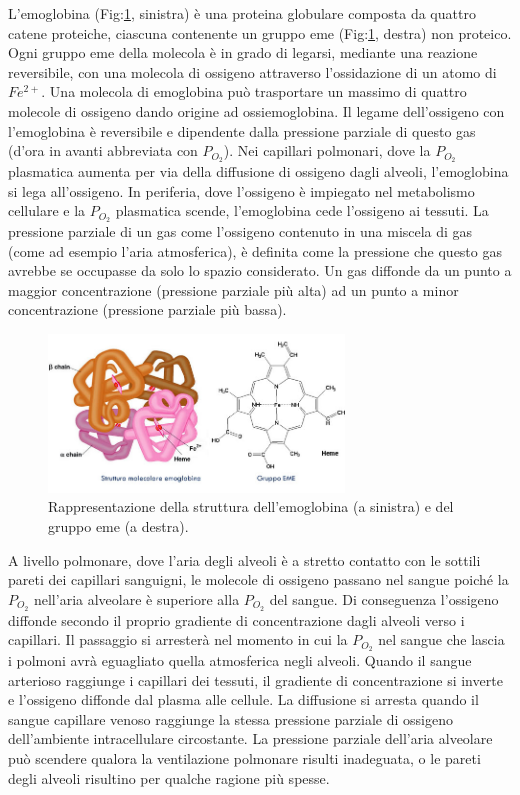 \documentclass[a4paper, 12pt]{book}
\begin{document}
L'emoglobina (Fig:\ref{fig:Structure}, sinistra) è una proteina globulare composta da quattro catene proteiche, ciascuna contenente un gruppo eme (Fig:\ref{fig:Structure}, destra) non proteico.
Ogni gruppo eme della molecola è in grado di legarsi, mediante una reazione reversibile, con una molecola di ossigeno attraverso l’ossidazione di un atomo di $Fe^{2+}$.
Una molecola di emoglobina può trasportare un massimo di quattro molecole di ossigeno dando origine ad ossiemoglobina.
Il legame dell'ossigeno con l'emoglobina è reversibile e dipendente dalla pressione parziale di questo gas (d'ora in avanti abbreviata con $P_{O_2}$).
Nei capillari polmonari, dove la $P_{O_2}$ plasmatica aumenta per via della diffusione di ossigeno dagli alveoli, l'emoglobina si lega all'ossigeno.
In periferia, dove l'ossigeno è impiegato nel metabolismo cellulare e la $P_{O_2}$ plasmatica scende, l'emoglobina cede l'ossigeno ai tessuti.
La pressione parziale di un gas come l'ossigeno contenuto in una miscela di gas (come ad esempio l'aria atmosferica), è definita come la pressione che questo gas avrebbe se occupasse da solo lo spazio considerato.
Un gas diffonde da un punto a maggior concentrazione (pressione parziale più alta) ad un punto a minor concentrazione (pressione parziale più bassa).
\begin{figure}[h!]
    \centering
    \includegraphics[width=0.7\textwidth]{emoglobina-struttura.jpeg}
    \caption{Rappresentazione della struttura dell'emoglobina (a sinistra) e del gruppo 			 eme (a destra).}
    \label{fig:Structure}
\end{figure}
A livello polmonare, dove l'aria degli alveoli è a stretto contatto con le sottili pareti dei capillari sanguigni, le molecole di ossigeno passano nel sangue poiché la $P_{O_2}$ nell'aria alveolare è superiore alla $P_{O_2}$ del sangue.
Di conseguenza l'ossigeno diffonde secondo il proprio gradiente di concentrazione dagli alveoli verso i capillari.
Il passaggio si arresterà nel momento in cui la $P_{O_2}$ nel sangue che lascia i polmoni avrà eguagliato quella atmosferica negli alveoli.
Quando il sangue arterioso raggiunge i capillari dei tessuti, il gradiente di concentrazione si inverte e l'ossigeno diffonde dal plasma alle cellule.
La diffusione si arresta quando il sangue capillare venoso raggiunge la stessa pressione parziale di ossigeno dell'ambiente intracellulare circostante.
La pressione parziale dell'aria alveolare può scendere qualora la ventilazione polmonare risulti inadeguata, o le pareti degli alveoli risultino per qualche ragione più spesse.
\end{document}
